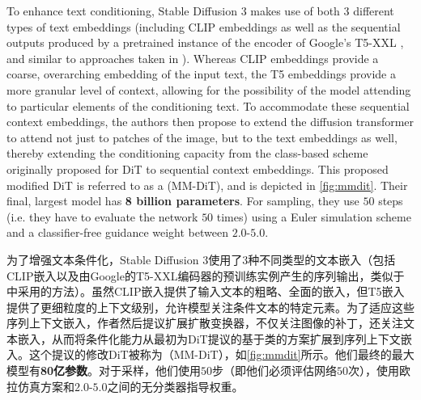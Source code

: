 To enhance text conditioning, Stable Diffusion 3 makes use of both 3 different types of text embeddings (including CLIP embeddings as well as the sequential outputs produced by a pretrained instance of the encoder of Google's T5-XXL \cite{t5}, and similar to approaches taken in \cite{balaji, saharia}). Whereas CLIP embeddings provide a coarse, overarching embedding of the input text, the T5 embeddings provide a more granular level of context, allowing for the possibility of the model attending to particular elements of the conditioning text. To accommodate these sequential context embeddings, the authors then propose to extend the diffusion transformer to attend not just to patches of the image, but to the text embeddings as well, thereby extending the conditioning capacity from the class-based scheme originally proposed for DiT to sequential context embeddings. This proposed modified DiT is referred to as a  (MM-DiT), and is depicted in \cref{fig:mmdit}. Their final, largest model has \textbf{8 billion parameters}. For sampling, they use $50$ steps (i.e. they have to evaluate the network $50$ times) using a Euler simulation scheme and a classifier-free guidance weight between $2.0$-$5.0$.

为了增强文本条件化，Stable Diffusion 3使用了3种不同类型的文本嵌入（包括CLIP嵌入以及由Google的T5-XXL编码器的预训练实例产生的序列输出\cite{t5}，类似于\cite{balaji, saharia}中采用的方法）。虽然CLIP嵌入提供了输入文本的粗略、全面的嵌入，但T5嵌入提供了更细粒度的上下文级别，允许模型关注条件文本的特定元素。为了适应这些序列上下文嵌入，作者然后提议扩展扩散变换器，不仅关注图像的补丁，还关注文本嵌入，从而将条件化能力从最初为DiT提议的基于类的方案扩展到序列上下文嵌入。这个提议的修改DiT被称为（MM-DiT），如\cref{fig:mmdit}所示。他们最终的最大模型有\textbf{80亿参数}。对于采样，他们使用$50$步（即他们必须评估网络$50$次），使用欧拉仿真方案和$2.0$-$5.0$之间的无分类器指导权重。


